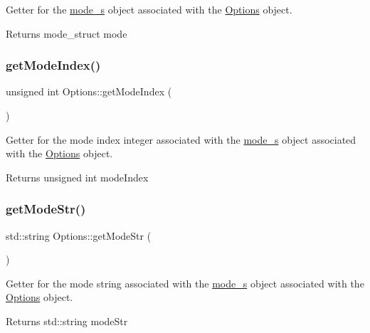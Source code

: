Getter for the \mbox{\hyperlink{structmode__s}{mode\+\_\+s}} object associated with the \mbox{\hyperlink{classOptions}{Options}} object. 

\begin{DoxyReturn}{Returns}
mode\+\_\+struct mode 
\end{DoxyReturn}
\mbox{\label{classOptions_a3a9dd5c843239fb9b535e51e05eaae75}} 
\subsubsection{\texorpdfstring{getModeIndex()}{getModeIndex()}}
{\footnotesize\ttfamily unsigned int Options\+::get\+Mode\+Index (\begin{DoxyParamCaption}{ }\end{DoxyParamCaption})}



Getter for the mode index integer associated with the \mbox{\hyperlink{structmode__s}{mode\+\_\+s}} object associated with the \mbox{\hyperlink{classOptions}{Options}} object. 

\begin{DoxyReturn}{Returns}
unsigned int mode\+Index 
\end{DoxyReturn}
\mbox{\label{classOptions_a61ee3094e1c27f99ba5d6af02c813f62}} 
\subsubsection{\texorpdfstring{getModeStr()}{getModeStr()}}
{\footnotesize\ttfamily std\+::string Options\+::get\+Mode\+Str (\begin{DoxyParamCaption}{ }\end{DoxyParamCaption})}



Getter for the mode string associated with the \mbox{\hyperlink{structmode__s}{mode\+\_\+s}} object associated with the \mbox{\hyperlink{classOptions}{Options}} object. 

\begin{DoxyReturn}{Returns}
std\+::string mode\+Str 
\end{DoxyReturn}
\mbox{\label{classOptions_a5d6a001ae1d9cd7d4b9f9fa698c0b8ae}} 
